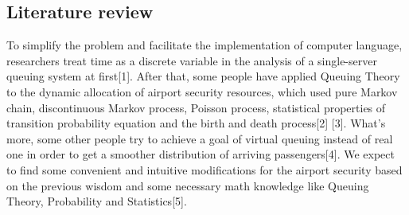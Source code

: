 \documentclass{mcmthesis}
\begin{document}
\subsection{Literature review}
To simplify the problem and facilitate the implementation of computer language,
researchers treat time as a discrete variable in the analysis of a single-server queuing
system at first[1]. After that, some people have applied Queuing Theory to the dynamic
allocation of airport security resources, which used pure Markov chain, discontinuous
Markov process, Poisson process, statistical properties of transition probability equation
and the birth and death process[2] [3]. What's more, some other people try to achieve a goal of virtual queuing instead of real one in order to get a smoother distribution of arriving passengers[4]. We expect to find some convenient and intuitive modifications for
the airport security based on the previous wisdom and some necessary math knowledge
like Queuing Theory, Probability and Statistics[5].
\end{document}

